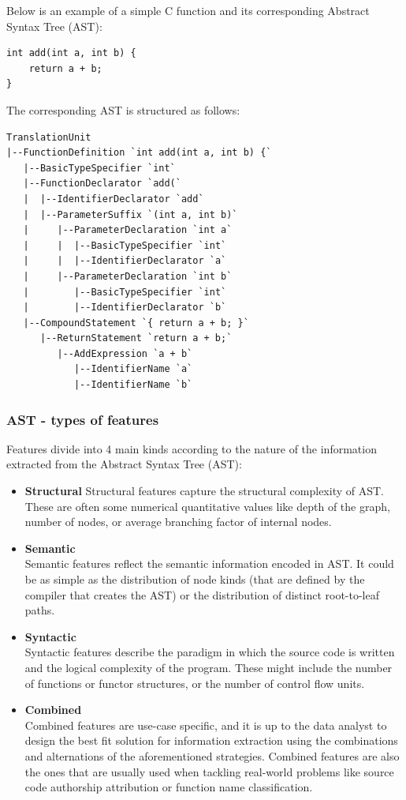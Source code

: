 \documentclass{article}
\begin{document}
Below is an example of a simple C function and its corresponding Abstract Syntax Tree (AST):
\begin{verbatim}
int add(int a, int b) {
    return a + b;
}
\end{verbatim}

The corresponding AST is structured as follows:
\begin{verbatim}
TranslationUnit
|--FunctionDefinition `int add(int a, int b) {`
   |--BasicTypeSpecifier `int`
   |--FunctionDeclarator `add(`
   |  |--IdentifierDeclarator `add`
   |  |--ParameterSuffix `(int a, int b)`
   |     |--ParameterDeclaration `int a`
   |     |  |--BasicTypeSpecifier `int`
   |     |  |--IdentifierDeclarator `a`
   |     |--ParameterDeclaration `int b`
   |        |--BasicTypeSpecifier `int`
   |        |--IdentifierDeclarator `b`
   |--CompoundStatement `{ return a + b; }`
      |--ReturnStatement `return a + b;`
         |--AddExpression `a + b`
            |--IdentifierName `a`
            |--IdentifierName `b`
\end{verbatim}
\label{verbatim:AST_example}

\subsubsection{AST - types of features}

Features divide into 4 main kinds according to the nature of the information extracted from the Abstract Syntax Tree (AST):
\begin{itemize}
    \item \textbf{Structural} \label{item:structural}
    Structural features capture the structural complexity of AST. These are often some numerical quantitative values like depth of the graph, number of nodes, or average branching factor of internal nodes.
    \item \textbf{Semantic} \\
    Semantic features reflect the semantic information encoded in AST. It could be as simple as the distribution of node kinds (that are defined by the compiler that creates the AST) or the distribution of distinct root-to-leaf paths.
    \item \textbf{Syntactic} \\
    Syntactic features describe the paradigm in which the source code is written and the logical complexity of the program. These might include the number of functions or functor structures, or the number of control flow units.
    \item \textbf{Combined} \\
    Combined features are use-case specific, and it is up to the data analyst to design the best fit solution for information extraction using the combinations and alternations of the aforementioned strategies. Combined features are also the ones that are usually used when tackling real-world problems like source code authorship attribution or function name classification.  
\end{itemize}
\end{document}
